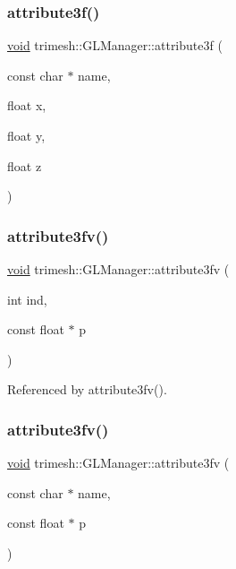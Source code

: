 \subsubsection{\texorpdfstring{attribute3f()}{attribute3f()}\hspace{0.1cm}{\footnotesize\ttfamily [2/2]}}
{\footnotesize\ttfamily \hyperlink{namespacetrimesh_a784ddfd979e1c579bda795a8edfc3f43}{void} trimesh\+::\+G\+L\+Manager\+::attribute3f (\begin{DoxyParamCaption}\item[{const char $\ast$}]{name,  }\item[{float}]{x,  }\item[{float}]{y,  }\item[{float}]{z }\end{DoxyParamCaption})\hspace{0.3cm}{\ttfamily [inline]}}

\mbox{\label{classtrimesh_1_1GLManager_ad60375a08ae2e7523b6737f83b789165}} 
\subsubsection{\texorpdfstring{attribute3fv()}{attribute3fv()}\hspace{0.1cm}{\footnotesize\ttfamily [1/2]}}
{\footnotesize\ttfamily \hyperlink{namespacetrimesh_a784ddfd979e1c579bda795a8edfc3f43}{void} trimesh\+::\+G\+L\+Manager\+::attribute3fv (\begin{DoxyParamCaption}\item[{int}]{ind,  }\item[{const float $\ast$}]{p }\end{DoxyParamCaption})\hspace{0.3cm}{\ttfamily [inline]}}



Referenced by attribute3fv().

\mbox{\label{classtrimesh_1_1GLManager_a258d943f3522bc4f7f56fb7753ca2481}} 
\subsubsection{\texorpdfstring{attribute3fv()}{attribute3fv()}\hspace{0.1cm}{\footnotesize\ttfamily [2/2]}}
{\footnotesize\ttfamily \hyperlink{namespacetrimesh_a784ddfd979e1c579bda795a8edfc3f43}{void} trimesh\+::\+G\+L\+Manager\+::attribute3fv (\begin{DoxyParamCaption}\item[{const char $\ast$}]{name,  }\item[{const float $\ast$}]{p }\end{DoxyParamCaption})\hspace{0.3cm}{\ttfamily [inline]}}


